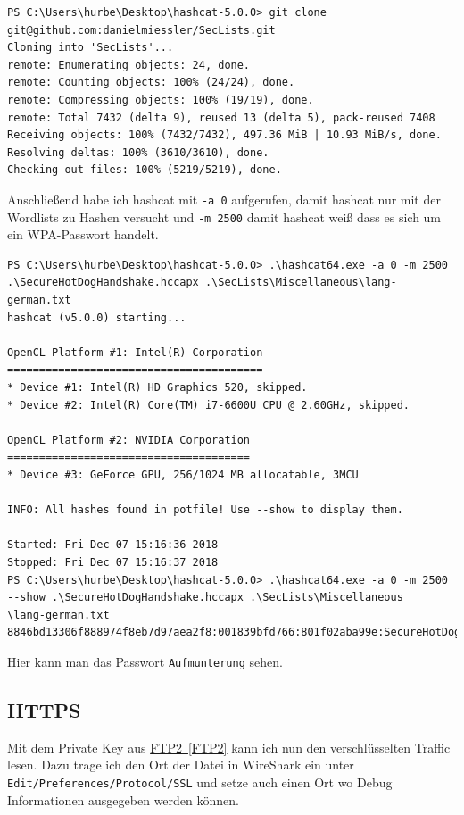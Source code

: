 \documentclass[12pt,a4paper,titlepage,oneside]{scrartcl}
\newcommand{\lang}{de}
\begin{document}
\begin{lstlisting}
PS C:\Users\hurbe\Desktop\hashcat-5.0.0> git clone git@github.com:danielmiessler/SecLists.git
Cloning into 'SecLists'...
remote: Enumerating objects: 24, done.
remote: Counting objects: 100% (24/24), done.
remote: Compressing objects: 100% (19/19), done.
remote: Total 7432 (delta 9), reused 13 (delta 5), pack-reused 7408
Receiving objects: 100% (7432/7432), 497.36 MiB | 10.93 MiB/s, done.
Resolving deltas: 100% (3610/3610), done.
Checking out files: 100% (5219/5219), done.
\end{lstlisting}

Anschließend habe ich hashcat mit \lstinline{-a 0} aufgerufen, damit hashcat nur mit der Wordlists zu Hashen versucht und \lstinline{-m 2500} damit hashcat weiß dass es sich um ein WPA-Passwort handelt.

\begin{lstlisting}
PS C:\Users\hurbe\Desktop\hashcat-5.0.0> .\hashcat64.exe -a 0 -m 2500 .\SecureHotDogHandshake.hccapx .\SecLists\Miscellaneous\lang-german.txt
hashcat (v5.0.0) starting...

OpenCL Platform #1: Intel(R) Corporation
========================================
* Device #1: Intel(R) HD Graphics 520, skipped.
* Device #2: Intel(R) Core(TM) i7-6600U CPU @ 2.60GHz, skipped.

OpenCL Platform #2: NVIDIA Corporation
======================================
* Device #3: GeForce GPU, 256/1024 MB allocatable, 3MCU

INFO: All hashes found in potfile! Use --show to display them.

Started: Fri Dec 07 15:16:36 2018
Stopped: Fri Dec 07 15:16:37 2018
PS C:\Users\hurbe\Desktop\hashcat-5.0.0> .\hashcat64.exe -a 0 -m 2500 --show .\SecureHotDogHandshake.hccapx .\SecLists\Miscellaneous
\lang-german.txt
8846bd13306f888974f8eb7d97aea2f8:001839bfd766:801f02aba99e:SecureHotDog:Aufmunterung
\end{lstlisting}

Hier kann man das Passwort \lstinline{Aufmunterung} sehen.

\subsection{HTTPS}

Mit dem Private Key aus \hyperref[FTP2]{FTP2~\ref*{FTP2}} kann ich nun den verschlüsselten Traffic lesen. Dazu trage ich den Ort der Datei in WireShark ein unter \lstinline{Edit/Preferences/Protocol/SSL} und setze auch einen Ort wo Debug Informationen ausgegeben werden können.
\end{document}
